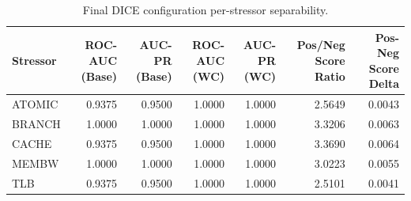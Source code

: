 \begin{table}[t]
\centering
\caption{Final DICE configuration per-stressor separability.}
\label{tab:dice_full_stressor}
\footnotesize
\begin{tabular}{lrrrrrr}
\toprule
Stressor & ROC-AUC (Base) & AUC-PR (Base) & ROC-AUC (WC) & AUC-PR (WC) & Pos/Neg Score Ratio & Pos-Neg Score Delta \\
\midrule
ATOMIC & 0.9375 & 0.9500 & 1.0000 & 1.0000 & 2.5649 & 0.0043 \\
BRANCH & 1.0000 & 1.0000 & 1.0000 & 1.0000 & 3.3206 & 0.0063 \\
CACHE & 0.9375 & 0.9500 & 1.0000 & 1.0000 & 3.3690 & 0.0064 \\
MEMBW & 1.0000 & 1.0000 & 1.0000 & 1.0000 & 3.0223 & 0.0055 \\
TLB & 0.9375 & 0.9500 & 1.0000 & 1.0000 & 2.5101 & 0.0041 \\
\bottomrule
\end{tabular}

\end{table}
